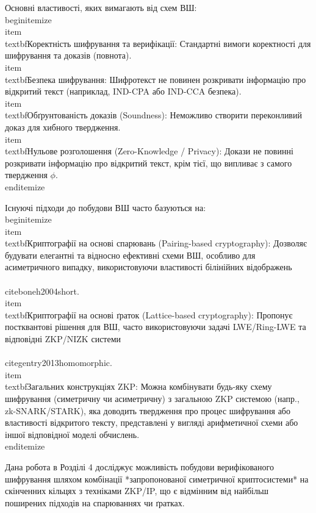 \documentclass[a4paper,12pt]{article}
\begin{document}
    Основні властивості, яких вимагають від схем ВШ:
    \\begin{itemize}
        \\item \\textbf{Коректність шифрування та верифікації:} Стандартні вимоги коректності для шифрування та доказів (повнота).
        \\item \\textbf{Безпека шифрування:} Шифротекст не повинен розкривати інформацію про відкритий текст (наприклад, IND-CPA або IND-CCA безпека).
        \\item \\textbf{Обґрунтованість доказів (Soundness):} Неможливо створити переконливий доказ для хибного твердження.
        \\item \\textbf{Нульове розголошення (Zero-Knowledge / Privacy):} Докази не повинні розкривати інформацію про відкритий текст, крім тієї, що випливає з самого твердження \(\phi\).
    \\end{itemize}

    Існуючі підходи до побудови ВШ часто базуються на:
    \\begin{itemize}
        \\item \\textbf{Криптографії на основі спарювань (Pairing-based cryptography):} Дозволяє будувати елегантні та відносно ефективні схеми ВШ, особливо для асиметричного випадку, використовуючи властивості білінійних відображень \\\\cite{boneh2004short}.
        \\item \\textbf{Криптографії на основі ґраток (Lattice-based cryptography):} Пропонує постквантові рішення для ВШ, часто використовуючи задачі LWE/Ring-LWE та відповідні ZKP/NIZK системи \\\\cite{gentry2013homomorphic}.
        \\item \\textbf{Загальних конструкціях ZKP:} Можна комбінувати будь-яку схему шифрування (симетричну чи асиметричну) з загальною ZKP системою (напр., zk-SNARK/STARK), яка доводить твердження про процес шифрування або властивості відкритого тексту, представлені у вигляді арифметичної схеми або іншої відповідної моделі обчислень.
    \\end{itemize}

    Дана робота в Розділі 4 досліджує можливість побудови верифікованого шифрування шляхом комбінації *запропонованої симетричної криптосистеми* на скінченних кільцях з техніками ZKP/IP, що є відмінним від найбільш поширених підходів на спарюваннях чи ґратках.
\end{document}

